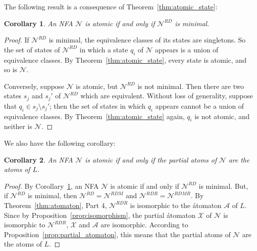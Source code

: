 \documentclass[preprint,12pt]{elsarticle}
\newcommand{\cA}{{\mathcal A}}
\newcommand{\cN}{{\mathcal N}}
\newcommand{\cX}{{\mathcal X}}
\newcommand{\rev}{R}
\newcommand{\deter}{D}
\newcommand{\mini}{M}
\newtheorem{corollary}{Corollary}
\begin{document}
The following result is a consequence of Theorem~\ref{thm:atomic_state}:
\begin{corollary}
\label{cor:atomic}
An NFA $\cN$ is atomic if and only if $\cN^{\rev\deter}$ is minimal. 
\end{corollary}
\begin{proof}
If $\cN^{\rev\deter}$ is minimal, the equivalence classes of its states  are singletons. 
So the set of states of $\cN^{\rev\deter}$  in which a state $q_i$ of $\cN$ appears is a union of equivalence classes.
By Theorem~\ref{thm:atomic_state},
every state is atomic, and  so is $\cN$.

Conversely, suppose $\cN$ is atomic, but $\cN^{RD}$ is not minimal.
Then there are two states $s_j$ and $s_j'$ of $\cN^{\rev\deter}$  which are equivalent.
Without loss of generality, suppose that $q_i\in s_j\setminus s_j'$; 
then the set of states in which $q_i$ appears cannot be a union of equivalence classes. 
By Theorem~\ref{thm:atomic_state} again, $q_i$ is not atomic, and neither is $\cN$.
\end{proof}

We also have the following corollary:

\begin{corollary}
\label{cor:atomic2}
An NFA $\cN$ is atomic if and only if the partial atoms of $\cN$ are the atoms of $L$. 
\end{corollary}
\begin{proof}
By Corollary~\ref{cor:atomic}, an NFA $\cN$ is atomic if and only if 
$\cN^{\rev\deter}$ is minimal. 
But, if $\cN^{\rev\deter}$ is minimal, then $\cN^{RD}=\cN^{RDM}$ and 
$\cN^{\rev\deter\rev}=\cN^{\rev\deter\mini\rev}$.
By Theorem~\ref{thm:atomaton}, Part 4, 
$\cN^{\rev\deter\rev}$ is isomorphic to the \'atomaton $\cA$ of $L$. 
Since by Proposition~\ref{prop:isomorphism}, the partial \'atomaton $\cX$ 
of $\cN$ is isomorphic to $\cN^{\rev\deter\rev}$, $\cX$ and $\cA$ 
are isomorphic. According to Proposition~\ref{prop:partial_atomaton},
this means that the partial atoms of $\cN$ are the atoms of $L$. 
\end{proof}
\end{document}
